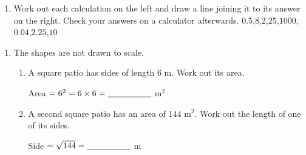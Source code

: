 \documentclass[12pt,a4paper]{article}
\newcommand{\ansline}[1][2.2cm]{\underline{\hspace{#1}}}
\begin{document}
\begin{enumerate}

\item Work out each calculation on the left and draw a line joining it to
its answer on the right. Check your answers on a calculator afterwards.
%
  {{$0.5$},{$8$},{$2$},{$25$},{$1000$},{$0.04$},{$2.25$},{$10$}}

\end{enumerate}

\begin{enumerate}[resume]

\newpage{}

\item The shapes are not drawn to scale.


\begin{enumerate}
  \item A square patio has sides of length $6$ m. Work out its area.

\vspace{2pt}
\begin{minipage}[t]{0.34\linewidth}
\centering
{}
\end{minipage}%
\begin{minipage}[t]{0.62\linewidth}
\vspace{1.4em}
Area $=6^2=6\times6=\ansline[1.8cm]$ m$^2$
\end{minipage}

  \item A second square patio has an area of $144$ m$^2$. Work out the length
        of one of its sides.

\vspace{2pt}
\begin{minipage}[t]{0.34\linewidth}
\centering
{}
\end{minipage}%
\begin{minipage}[t]{0.62\linewidth}
\vspace{1.4em}
Side $=\sqrt{144}=\ansline[1.8cm]$ m
\end{minipage}


\end{enumerate}
\end{enumerate}
\end{document}
